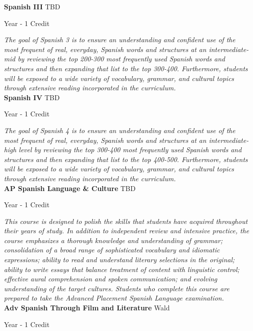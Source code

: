\noindent\textbf{Spanish III} \hfill TBD

\noindent Year - 1 Credit

\vspace{1mm}\emph{The goal of Spanish 3 is to ensure an understanding and confident use of the most frequent of real, everyday, Spanish words and structures at an intermediate-mid by reviewing the top 200-300 most frequently used Spanish words and structures and then expanding that list to the top 300-400.  Furthermore, students will be exposed to a wide variety of vocabulary, grammar, and cultural topics through extensive reading incorporated in the curriculum.}\\

\noindent\textbf{Spanish IV} \hfill TBD

\noindent Year - 1 Credit

\vspace{1mm}\emph{The goal of Spanish 4 is to ensure an understanding and confident use of the most frequent of real, everyday, Spanish words and structures at an intermediate-high level by reviewing the top 300-400 most frequently used Spanish words and structures and then expanding that list to the top 400-500.  Furthermore, students will be exposed to a wide variety of vocabulary, grammar, and cultural topics through extensive reading incorporated in the curriculum.}\\

\noindent\textbf{AP Spanish Language \& Culture} \hfill TBD

\noindent Year - 1 Credit

\vspace{1mm}\emph{This course is designed to polish the skills that students have acquired throughout their years of study. In addition to independent review and intensive practice, the course emphasizes a thorough knowledge and understanding of grammar; consolidation of a broad range of sophisticated vocabulary and idiomatic expressions; ability to read and understand literary selections in the original; ability to write essays that balance treatment of content with linguistic control; effective aural comprehension and spoken communication; and evolving understanding of the target cultures. Students who complete this course are prepared to take the Advanced Placement Spanish Language examination.}\\

\noindent\textbf{Adv Spanish Through Film and Literature} \hfill Wald

\noindent Year - 1 Credit

